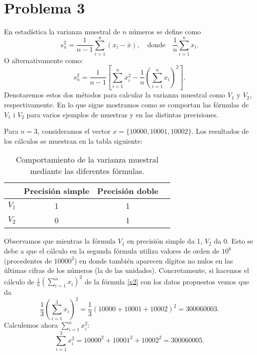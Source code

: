\documentclass[a4paper]{article}
\begin{document}
\section*{Problema 3}
En estadística la varianza muestral de $n$ números se define como \begin{equation}
    s_{n}^2=\frac{1}{n-1}\sum_{i=1}^{n}(x_i-\bar{x}),\quad\text{donde}\quad\frac{1}{n}\sum_{i=1}^{n}x_{i}.
\end{equation}
O alternativamente como:  
\begin{equation}
    s_{n}^{2}=\frac{1}{n-1}\left[\sum_{i=1}^{n}x_{i}^2-\frac{1}{n}\left(\sum_{i=1}^{n}x_{i}\right)^2\right].
    \label{v2}
\end{equation} Denotaremos estos dos métodos para calcular la varianza muestral como $V_{1}$ y $V_{2}$, respectivamente. En lo que sigue mostramos como se comportan las fórmulas de $V_1$ i $V_2$ para varios ejemplos de muestras y en las distintas precisiones.\par Para $n=3$, consideramos el vector $x=\{10000,10001,10002\}$. Los resultados de los cálculos se muestran en la tabla siguiente:\par
\begin{table}[ht]
	\centering
	\begin{tabular}{|c|c|c|c|}
	    \hline
		& Precisión simple & Precisión doble \\
		\hline 
		$V_{1}$ & 1 & 1\\
		\hline
		$V_{2}$ & 0 & 1\\
		\hline
	\end{tabular}
		\caption{Comportamiento de la varianza muestral mediante las diferentes fórmulas.}
		\label{tab:11}
\end{table}
Observamos que mientras la fórmula $V_{1}$ en precisión simple da 1, $V_{2}$ da 0. Esto se debe a que el cálculo en la segunda fórmula utiliza valores de orden de $10^{8}$ (procedentes de $10000^2$) en donde también aparecen dígitos no nulos en las últimas cifras de los números (la de las unidades). Concretamente, si hacemos el cálculo de $\frac{1}{n}\left(\sum_{i=1}^{n}x_{i}\right)^2$ de la fórmula \eqref{v2} con los datos propuestos vemos que da 
\begin{equation}
    \frac{1}{3}\left(\sum_{i=1}^3x_{i}\right)^2=\frac{1}{3}(10000+10001+10002)^2=300060003.
    \label{v11}
\end{equation}
Calculemos ahora $\sum_{i=1}^{n}x_{i}^2$: 
\begin{equation}
\sum_{i=1}^{3}x_{i}^2=10000^2+10001^2+10002^2=300060005.
\label{v12}
\end{equation}
\end{document}
